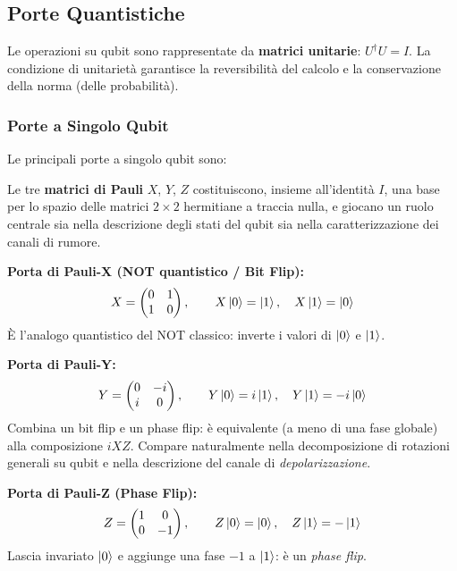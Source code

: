 \begin{onehalfspace}
\subsection{Porte Quantistiche}

Le operazioni su qubit sono rappresentate da \textbf{matrici unitarie}: $U^\dagger U = I$. La condizione di unitarietà garantisce la reversibilità del calcolo e la conservazione della norma (delle probabilità).

\subsubsection{Porte a Singolo Qubit}

Le principali porte a singolo qubit sono:

Le tre \textbf{matrici di Pauli} $X$, $Y$, $Z$ costituiscono, insieme all'identità $I$, una base per lo spazio delle matrici $2\times 2$ hermitiane a traccia nulla, e giocano un ruolo centrale sia nella descrizione degli stati del qubit sia nella caratterizzazione dei canali di rumore.

\textbf{Porta di Pauli-X (NOT quantistico / Bit Flip):}
\begin{equation}
    X = \begin{pmatrix} 0 & 1 \\ 1 & 0 \end{pmatrix}, \qquad X\ket{0} = \ket{1}, \quad X\ket{1} = \ket{0}
\end{equation}
È l'analogo quantistico del NOT classico: inverte i valori di $\ket{0}$ e $\ket{1}$.

\textbf{Porta di Pauli-Y:}
\begin{equation}
    Y = \begin{pmatrix} 0 & -i \\ i & 0 \end{pmatrix}, \qquad Y\ket{0} = i\ket{1}, \quad Y\ket{1} = -i\ket{0}
\end{equation}
Combina un bit flip e un phase flip: è equivalente (a meno di una fase globale) alla composizione $iXZ$. Compare naturalmente nella decomposizione di rotazioni generali su qubit e nella descrizione del canale di \textit{depolarizzazione}.

\textbf{Porta di Pauli-Z (Phase Flip):}
\begin{equation}
    Z = \begin{pmatrix} 1 & 0 \\ 0 & -1 \end{pmatrix}, \qquad Z\ket{0} = \ket{0}, \quad Z\ket{1} = -\ket{1}
\end{equation}
Lascia invariato $\ket{0}$ e aggiunge una fase $-1$ a $\ket{1}$: è un \textit{phase flip}.


\end{onehalfspace}
